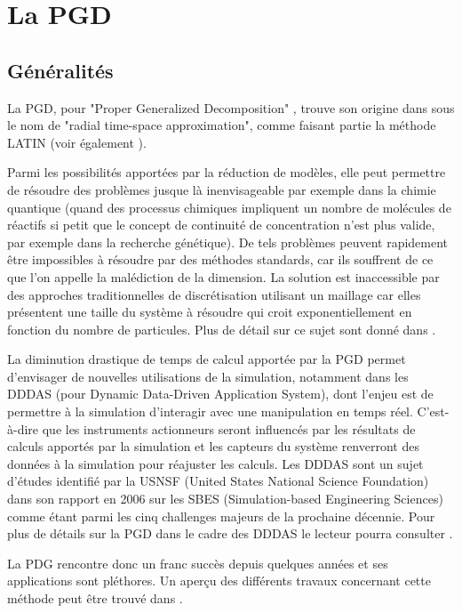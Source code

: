 \section{La PGD}
\subsection{Généralités}
La PGD, pour "Proper Generalized Decomposition" , trouve son origine dans \cite{LATIN1} sous le nom de "radial time-space approximation", comme faisant partie la méthode LATIN (voir également \cite{LATIN2}). 

Parmi les possibilités apportées par la réduction de modèles, elle peut permettre de résoudre des problèmes jusque là inenvisageable par exemple dans la chimie quantique (quand des processus chimiques impliquent un nombre de molécules de réactifs si petit que le concept de continuité de concentration n'est plus valide, par exemple dans la recherche génétique). De tels problèmes peuvent rapidement être impossibles à résoudre par des méthodes standards, car ils souffrent de ce que l'on appelle la malédiction de la dimension. La solution est inaccessible par des approches traditionnelles de discrétisation utilisant un maillage car elles présentent une taille du système à résoudre qui croit exponentiellement en fonction du nombre de particules. Plus de détail sur ce sujet sont donné dans \cite{Paradigm}.

La diminution drastique de temps de calcul apportée par la PGD permet d'envisager de nouvelles utilisations de la simulation, notamment dans les DDDAS (pour Dynamic Data-Driven Application System), dont l'enjeu est de permettre à la simulation d'interagir avec une manipulation en temps réel. C'est-à-dire que les instruments actionneurs seront influencés par les résultats de calculs apportés par la simulation et les capteurs du système renverront des données à la simulation pour réajuster les calculs. Les DDDAS sont un sujet d'études identifié par la USNSF (United States National Science Foundation) dans son rapport en 2006 sur les SBES (Simulation-based Engineering Sciences) comme étant parmi les cinq challenges majeurs de la prochaine décennie. Pour plus de détails sur la PGD dans le cadre des DDDAS le lecteur pourra consulter \cite{DDAS}.

La PDG rencontre donc un franc succès depuis quelques années et ses applications sont pléthores. Un aperçu des différents travaux concernant cette méthode peut être trouvé dans \cite{ShortReview}.

